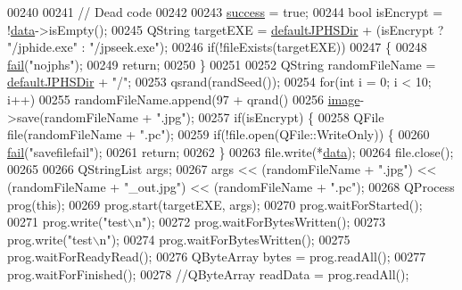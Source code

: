 \begin{DoxyCode}
00240 
00241     \textcolor{comment}{// Dead code}
00242 
00243     \mbox{\hyperlink{class_model_p_c_a945ffbbc44a832b953c191debd448f4c}{success}} = \textcolor{keyword}{true};
00244     \textcolor{keywordtype}{bool} isEncrypt = !\mbox{\hyperlink{namespace_errors_dict_setup_af570460846fb9f0c91abd308a095dcdc}{data}}->isEmpty();
00245     QString targetEXE = \mbox{\hyperlink{class_model_p_c_abd038306f14f22fb885a1697c96d6335}{defaultJPHSDir}} + (isEncrypt ? \textcolor{stringliteral}{"/jphide.exe"} : \textcolor{stringliteral}{"/jpseek.exe"});
00246     \textcolor{keywordflow}{if}(!fileExists(targetEXE))
00247     \{
00248         \mbox{\hyperlink{class_model_p_c_a47464b59b7e37fcee25e55475708aabd}{fail}}(\textcolor{stringliteral}{"nojphs"});
00249         \textcolor{keywordflow}{return};
00250     \}
00251 
00252     QString randomFileName = \mbox{\hyperlink{class_model_p_c_abd038306f14f22fb885a1697c96d6335}{defaultJPHSDir}} + \textcolor{stringliteral}{"/"};
00253     qsrand(randSeed());
00254     \textcolor{keywordflow}{for}(\textcolor{keywordtype}{int} i = 0; i < 10; i++)
00255         randomFileName.append(97 + qrand() %
00256     \mbox{\hyperlink{namespacetests-setup_ad55b685280f549e15688a94cbb89f512}{image}}->save(randomFileName + \textcolor{stringliteral}{".jpg"});
00257     \textcolor{keywordflow}{if}(isEncrypt) \{
00258         QFile file(randomFileName + \textcolor{stringliteral}{".pc"});
00259         \textcolor{keywordflow}{if}(!file.open(QFile::WriteOnly)) \{
00260             \mbox{\hyperlink{class_model_p_c_a47464b59b7e37fcee25e55475708aabd}{fail}}(\textcolor{stringliteral}{"savefilefail"});
00261             \textcolor{keywordflow}{return};
00262         \}
00263         file.write(*\mbox{\hyperlink{namespace_errors_dict_setup_af570460846fb9f0c91abd308a095dcdc}{data}});
00264         file.close();
00265 
00266         QStringList args;
00267         args << (randomFileName + \textcolor{stringliteral}{".jpg"}) << (randomFileName + \textcolor{stringliteral}{"\_out.jpg"}) << (randomFileName + \textcolor{stringliteral}{".pc"});
00268         QProcess prog(\textcolor{keyword}{this});
00269         prog.start(targetEXE, args);
00270         prog.waitForStarted();
00271         prog.write(\textcolor{stringliteral}{"test\(\backslash\)n"});
00272         prog.waitForBytesWritten();
00273         prog.write(\textcolor{stringliteral}{"test\(\backslash\)n"});
00274         prog.waitForBytesWritten();
00275         prog.waitForReadyRead();
00276         QByteArray bytes = prog.readAll();
00277         prog.waitForFinished();
00278         \textcolor{comment}{//QByteArray readData = prog.readAll();}

\end{DoxyCode}
